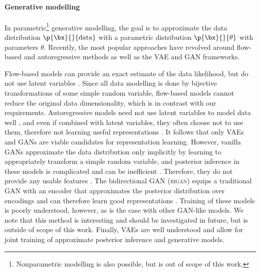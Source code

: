 	\paragraph{Generative modelling}
	In parametric\footnote{Nonparametric modelling is also possible, but is out of scope of this work.} generative modelling, the goal is to approximate the data distribution $\p{\bx}{}{\mathrm{data}}$ with a parametric distribution $\p{\bx}{}{\theta}$ with parameters $\theta$.
	Recently, the most popular approaches have revolved around flow-based and autoregressive methods as well as the \gls{VAE} and \gls{GAN} frameworks.
	
	Flow-based models can provide an exact estimate of the data likelihood, but do not use latent variables \citep{Rezende2015flow,Dinh2016realnvp,Kingma2018glow}.
	Since all data modelling is done by bijective transformations of some simple random variable, flow-based models cannot reduce the original data dimensionality, which is in contrast with our requirements.
	Autoregressive models need not use latent variables to model data well \citep{Uria2016nade,Oord2016wavenet}, and even if combined with latent variables, they often choose not to use them, therefore not learning useful representations \citep{Gulrajani2016pixelvae}.
	It follows that only \gls{VAE}s and \gls{GAN}s are viable candidates for representation learning.
	However, vanilla \gls{GAN}s approximate the data distribution only implicitly by learning to appropriately transform a simple random variable, and posterior inference in these models is complicated and can be inefficient \citep{Bojanowski2017gan}.
	Therefore, they do not provide any usable features \citep{Radford2016gan,Goodfellow2014generative}.
	The bidirectional \gls{GAN} (\textsc{bigan}) equips a traditional \gls{GAN} with an encoder that approximates the posterior distribution over encodings and can therefore learn good representations \citep{Donahue2017bigan, Donahue2019bigbigan}.
	Training of these models is poorly understood, however, as is the case with other \gls{GAN}-like models.
	We note that this method is interesting and should be investigated in future, but is outside of scope of this work.
	Finally, \gls{VAE}s are well understood and allow for joint training of approximate posterior inference and generative models.
	
